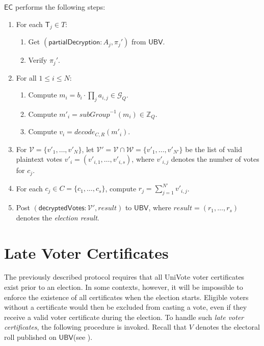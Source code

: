 \documentclass[bibtotoc,halfparskip,oneside]{scrreprt}
\newcommand{\EC}{\ensuremath{\mathsf{EC}}\xspace}
\newcommand{\UBV}{\ensuremath{\mathsf{UBV}}\xspace}
\newcommand{\Tallier}[1]{\ensuremath{\mathsf{T}_{#1}}\xspace}
\begin{document}
	\EC performs the following steps:
	\begin{enumerate}[resume]
		\item For each $\Tallier{j}\in T$:
		\begin{enumerate}
			\item Get $(\mathsf{partialDecryption}:A_j,\pi_{j}')$ from \UBV.
			\item Verify $\pi_{j}'$.
		\end{enumerate}
		\item For all $1\leq i\leq N$:
		\begin{enumerate}
			\item Compute $m_i=b_i\cdot\prod_j a_{i,j}\in\mathcal{G}_Q$.
			\item Compute $m'_i = \mathit{subGroup}^{-1}(m_i)\in\mathbb{Z}_Q$.
			\item Compute $v_i = \mathit{decode}_{C,R}(m'_i)$.
		\end{enumerate}
		\item For $\mathcal{V}=\{v'_1,\ldots,v'_{N}\}$, let $\mathcal{V}'=\mathcal{V}\cap \mathcal{W}=\{v'_1,\ldots,v'_{N'}\}$ be the list of valid plaintext votes $v'_i=(v'_{i,1},\ldots,v'_{i,s})$, where $v'_{i,j}$ denotes the number of votes for $c_j$.
		\item For each $c_j\in C=\{c_1,\ldots,c_s\}$, compute $r_j =\sum_{j=1}^{N'} v'_{i,j}$.
		\item Post $(\mathsf{decryptedVotes}:\mathcal{V}',\mathit{result})$ to \UBV, where $\mathit{result}=(r_1,\ldots,r_s)$ denotes the \emph{election result}.
	\end{enumerate}
	
	\section{Late Voter Certificates}
	
	The previously described protocol requires that all UniVote voter certificates exist prior to an election. In some contexts, however, it will be impossible to enforce the existence of all certificates when the election starts. Eligible voters without a certificate would then be excluded from casting a vote, even if they receive a valid voter certificate during the election. To handle such \emph{late voter certificates}, the following procedure is invoked. Recall that $V$ denotes the electoral roll published on \UBV (see ).
	
\end{document}
